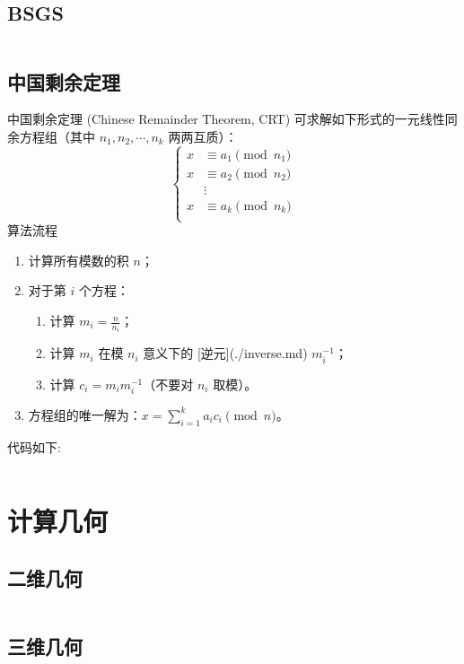 \documentclass[a4paper,11pt]{article}
\begin{document}
\subsection{BSGS}
\inputminted[breaklines,linenos,frame=leftline]{c++}{math/BSGS.cpp}

\subsection{中国剩余定理}
中国剩余定理 (Chinese Remainder Theorem, CRT) 可求解如下形式的一元线性同余方程组（其中 $n_1, n_2, \cdots, n_k$ 两两互质）：
$$
\begin{cases}
x &\equiv a_1 \pmod {n_1} \\
x &\equiv a_2 \pmod {n_2} \\
  &\vdots \\
x &\equiv a_k \pmod {n_k} \\
\end{cases}
$$
算法流程
\begin{enumerate}
    \item 计算所有模数的积 $n$；
    \item 对于第 $i$ 个方程：
        \begin{enumerate}
            \item 计算 $m_i=\frac{n}{n_i}$；
            \item 计算 $m_i$ 在模 $n_i$ 意义下的 [逆元](./inverse.md)  $m_i^{-1}$；
            \item 计算 $c_i=m_im_i^{-1}$（不要对 $n_i$ 取模）。
        \end{enumerate}
    \item 方程组的唯一解为：$x=\sum_{i=1}^k a_ic_i \pmod n$。
\end{enumerate}
代码如下:
\inputminted[breaklines,linenos,frame=leftline]{c++}{math/crt.cpp}

\newpage
\section{计算几何}

\subsection{二维几何}
\inputminted[breaklines,linenos,frame=leftline]{c++}{geometry/2d.cpp}

\subsection{三维几何}
\inputminted[breaklines,linenos,frame=leftline]{c++}{geometry/3d.cpp}
\end{document}
